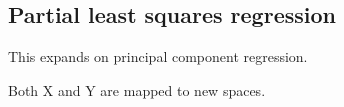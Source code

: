 
\subsection{Partial least squares regression}

This expands on principal component regression.

Both X and Y are mapped to new spaces.

